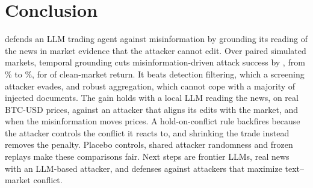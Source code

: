 \section{Conclusion}\label{sec:conclusion}
\rhal{} defends an LLM trading agent against misinformation by grounding its reading of the news in market evidence that the attacker cannot edit. Over  paired simulated markets, temporal grounding cuts misinformation-driven attack success by , from \% to \%, for \pp{} of clean-market return. It beats detection filtering, which a screening attacker evades, and robust aggregation, which cannot cope with a majority of injected documents. The gain holds with a local LLM reading the news, on real BTC-USD prices, against an attacker that aligns its edits with the market, and when the misinformation moves prices. A hold-on-conflict rule backfires because the attacker controls the conflict it reacts to, and shrinking the trade instead removes the penalty. Placebo controls, shared attacker randomness and frozen replays make these comparisons fair. Next steps are frontier LLMs, real news with an LLM-based attacker, and defenses against attackers that maximize text--market conflict.
